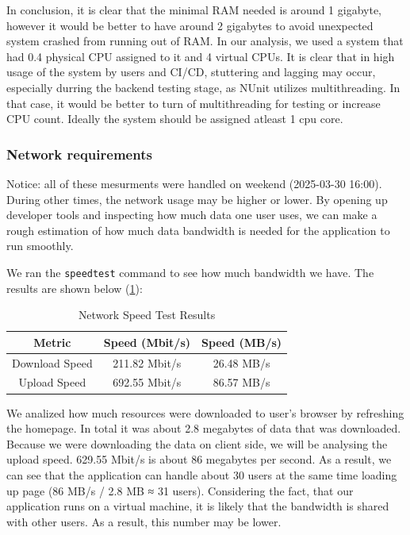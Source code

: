 \documentclass[]{VUMIFTemplateClass}
\begin{document}
In conclusion, it is clear that the minimal RAM needed is around 1 gigabyte, however it would be better to have around 2 gigabytes to avoid unexpected system crashed from running out of RAM.
In our analysis, we used a system that had 0.4 physical CPU assigned to it and 4 virtual CPUs. It is clear that in high usage of the system by users and CI/CD, stuttering and lagging may occur,
especially durring the backend testing stage, as NUnit utilizes multithreading. In that case, it would be better to turn of multithreading for testing or increase CPU count. Ideally the system should
be assigned atleast 1 cpu core.

\subsubsection{Network requirements}
Notice: all of these mesurments were handled on weekend (2025-03-30 16:00). During other times, the network usage may be higher or lower.
By opening up developer tools and inspecting how much data one user uses, we can make a rough estimation of how much data bandwidth is needed for the application to run smoothly.

We ran the \texttt{speedtest} command to see how much bandwidth we have. The results are shown below (\ref{tab:network-speed}):
\begin{table}[H]
    \centering
    \begin{tabular}{|c|c|c|}
        \hline
        \textbf{Metric} & \textbf{Speed (Mbit/s)} & \textbf{Speed (MB/s)} \\ 
        \hline
        Download Speed & 211.82 Mbit/s & 26.48 MB/s \\ 
        \hline
        Upload Speed & 692.55 Mbit/s & 86.57 MB/s \\ 
        \hline
        \end{tabular}
    \caption{Network Speed Test Results}
    \label{tab:network-speed}
\end{table}
 
We analized how much resources were downloaded to user's browser by refreshing the homepage. In total it was about 2.8 megabytes of data that was downloaded.
Because we were downloading the data on client side, we will be analysing the upload speed. 629.55 Mbit/s is about 86 megabytes per second.
As a result, we can see that the application can handle about 30 users at the same time loading up page (86 MB/s / 2.8 MB ≈ 31 users).
Considering the fact, that our application runs on a virtual machine, it is likely that the bandwidth is shared with other users. As a result, this number may be lower.
\end{document}
